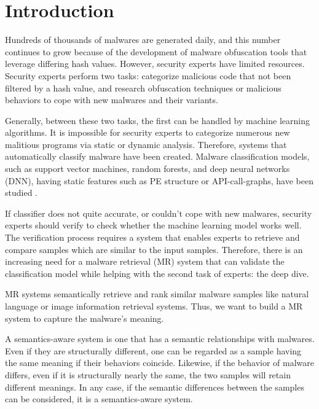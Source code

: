 \section{Introduction}

Hundreds of thousands of malwares are generated daily, and this number continues to grow because of the development of malware obfuscation tools that leverage differing hash values. However, security experts have limited resources. Security experts perform two tasks: categorize malicious code that not been filtered by a hash value, and research obfuscation techniques or malicious behaviors to cope with new malwares and their variants.

Generally, between these two tasks, the first can be handled by machine learning algorithms. It is impossible for security experts to categorize numerous new malitious programs via static or dynamic analysis. Therefore, systems that automatically classify malware have been created. Malware classification models, such as support vector machines, random forests, and deep neural networks (DNN), having static features such as PE structure or API-call-graphs, have been studied \cite{chen2012malware, park2010fast, bai2014malware, yuan2014droid, saxe2015deep}.

If classifier does not quite accurate, or couldn't cope with new malwares, security experts should verify to check whether the machine learning model works well. The verification process requires a system that enables experts to retrieve and compare samples which are similar to the input samples. Therefore, there is an increasing need for a malware retrieval (MR) system that can validate the classification model while helping with the second task of experts: the deep dive.

MR systems semantically retrieve and rank similar malware samples like natural language or image information retrieval systems. Thus, we want to build a MR system to capture the malware’s meaning.

A semantics-aware system is one that has a semantic relationships with malwares. Even if they are structurally different, one can be regarded as a sample having the same meaning if their behaviors coincide. Likewise, if the behavior of malware differs, even if it is structurally nearly the same, the two samples will retain different meanings. In any case, if the semantic differences between the samples can be considered, it is a semantics-aware system.
 
